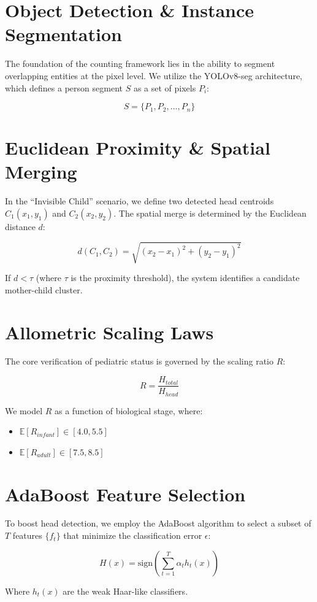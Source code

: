 \section{Object Detection \& Instance Segmentation}
The foundation of the counting framework lies in the ability to segment overlapping entities at the pixel level. We utilize the YOLOv8-seg architecture, which defines a person segment $S$ as a set of pixels $P_i$:

\begin{equation}
    S = \{ P_1, P_2, \dots, P_n \}
\end{equation}

\section{Euclidean Proximity \& Spatial Merging}
In the ``Invisible Child'' scenario, we define two detected head centroids $C_1(x_1, y_1)$ and $C_2(x_2, y_2)$. The spatial merge is determined by the Euclidean distance $d$:

\begin{equation}
    d(C_1, C_2) = \sqrt{(x_2 - x_1)^2 + (y_2 - y_1)^2}
\end{equation}

If $d < \tau$ (where $\tau$ is the proximity threshold), the system identifies a candidate mother-child cluster.

\section{Allometric Scaling Laws}
The core verification of pediatric status is governed by the scaling ratio $R$:

\begin{equation}
    R = \frac{H_{total}}{H_{head}}
\end{equation}

We model $R$ as a function of biological stage, where:
\begin{itemize}
    \item $\mathbb{E}[R_{infant}] \in [4.0, 5.5]$
    \item $\mathbb{E}[R_{adult}] \in [7.5, 8.5]$
\end{itemize}

\section{AdaBoost Feature Selection}
To boost head detection, we employ the AdaBoost algorithm to select a subset of $T$ features $\{ f_t \}$ that minimize the classification error $\epsilon$:

\begin{equation}
    H(x) = \text{sign} \left( \sum_{t=1}^T \alpha_t h_t(x) \right)
\end{equation}

Where $h_t(x)$ are the weak Haar-like classifiers.

